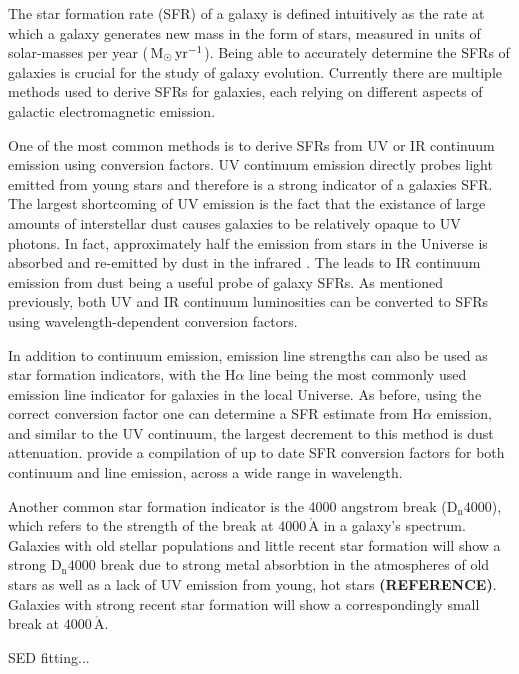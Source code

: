 The star formation rate (SFR) of a galaxy is defined intuitively as the rate
at which a galaxy generates new mass in the form of stars, measured in
units of solar-masses per year ($\,\mathrm{M_{\odot}}\,\mathrm{yr^{-1}}$).  Being
able to accurately determine the SFRs of galaxies is crucial for the
study of galaxy evolution.  Currently there are multiple methods used
to derive SFRs for galaxies, each relying on different aspects of
galactic electromagnetic emission.
\par
One of the most common methods is to derive SFRs from UV or IR
continuum 
emission using conversion factors.  UV continuum emission directly
probes light emitted from young stars and therefore is a strong
indicator of a galaxies SFR.  The largest shortcoming of UV emission
is the fact that the existance of large amounts of interstellar dust
causes galaxies to be relatively opaque to UV photons.  In fact,
approximately half the emission from stars in the Universe is absorbed
and re-emitted by dust in the infrared \citep{kennicutt2012}.
The leads to IR continuum emission from dust being a useful probe of
galaxy SFRs.  As mentioned previously, both UV and IR continuum
luminosities can be converted to SFRs using wavelength-dependent
conversion factors.
\par
In addition to continuum emission, emission line strengths can also be
used as star formation indicators, with the $\mathrm{H}\alpha$ line
being the most commonly used emission line indicator for galaxies in
the local Universe.  As before, using the correct conversion factor
one can determine a SFR estimate from $\mathrm{H}\alpha$ emission, and
similar to the UV continuum, the largest decrement to this method is
dust attenuation.  \citet{kennicutt2012} provide a compilation of up
to date SFR conversion factors for both continuum and line emission,
across a wide range in wavelength.
\par
Another common star formation indicator is the 4000 angstrom break
($\mathrm{D_n}4000$), which refers to the strength of the break at
$4000\,\mathrm{\mathring{A}}$ in a galaxy's spectrum.  Galaxies with
old stellar populations and little recent star formation will show a
strong $\mathrm{D_n}4000$ break due to strong metal absorbtion in the
atmospheres of old stars as well as a lack of UV emission from young,
hot stars \textbf{(REFERENCE)}.  Galaxies with strong recent star
formation will show a correspondingly small break at
$4000\,\mathrm{\mathring{A}}$.
\par
SED fitting...
\par
